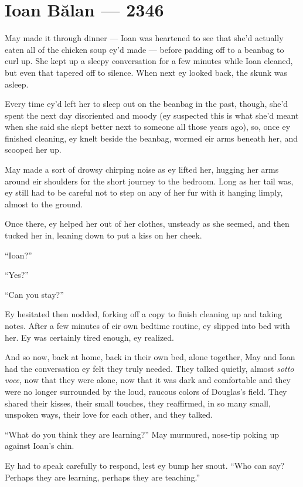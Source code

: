 \hypertarget{ioan-bux103lan-2346}{%
\chapter{Ioan Bălan — 2346}\label{ioan-bux103lan-2346}}

May made it through dinner — Ioan was heartened to see that she'd actually eaten all of the chicken soup ey'd made — before padding off to a beanbag to curl up. She kept up a sleepy conversation for a few minutes while Ioan cleaned, but even that tapered off to silence. When next ey looked back, the skunk was asleep.

Every time ey'd left her to sleep out on the beanbag in the past, though, she'd spent the next day disoriented and moody (ey suspected this is what she'd meant when she said she slept better next to someone all those years ago), so, once ey finished cleaning, ey knelt beside the beanbag, wormed eir arms beneath her, and scooped her up.

May made a sort of drowsy chirping noise as ey lifted her, hugging her arms around eir shoulders for the short journey to the bedroom. Long as her tail was, ey still had to be careful not to step on any of her fur with it hanging limply, almost to the ground.

Once there, ey helped her out of her clothes, unsteady as she seemed, and then tucked her in, leaning down to put a kiss on her cheek.

``Ioan?''

``Yes?''

``Can you stay?''

Ey hesitated then nodded, forking off a copy to finish cleaning up and taking notes. After a few minutes of eir own bedtime routine, ey slipped into bed with her. Ey was certainly tired enough, ey realized.

And so now, back at home, back in their own bed, alone together, May and Ioan had the conversation ey felt they truly needed. They talked quietly, almost \emph{sotto voce}, now that they were alone, now that it was dark and comfortable and they were no longer surrounded by the loud, raucous colors of Douglas's field. They shared their kisses, their small touches, they reaffirmed, in so many small, unspoken ways, their love for each other, and they talked.

``What do you think they are learning?'' May murmured, nose-tip poking up against Ioan's chin.

Ey had to speak carefully to respond, lest ey bump her snout. ``Who can say? Perhaps they are learning, perhaps they are teaching.''


